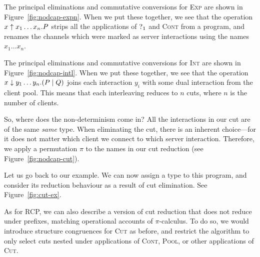 \documentclass[a4paper,UKenglish]{lipics-v2016}
\begin{document}
The principal eliminations and commutative conversions for \textsc{Exp} are
shown in Figure~\ref{fig:nodcap-expn}. When we put these together, we see that
the operation $\expn{x}{x_1 \dots x_n}P$ strips all the applications of
$\give[1]{}$ and \textsc{Cont} from a program, and renames the channels which
were marked as server interactions using the names $x_1 \dots x_n$.
%

%
The principal eliminations and commutative conversions for \textsc{Int} are
shown in Figure~\ref{fig:nodcap-intl}. When we put these together, we see that
the operation $\intl{x}{y_1 \dots y_n}(P \mid Q)$ joins each interaction $y_i$
with some dual interaction from the client pool. This means that each
interleaving reduces to $n$ cuts, where $n$ is the number of clients.
%


So, where does the non-determinism come in? All the interactions in our cut are
of the same \emph{same} type. When eliminating the cut, there is an inherent
choice---for it does not matter which client we connect to which server
interaction. Therefore, we apply a permutation $\pi$ to the names in our cut
reduction (see Figure~\ref{fig:nodcap-cut}).

Let us go back to our example. We can now assign a type to this program, and
consider its reduction behaviour as a result of cut elimination. See
Figure~\ref{fig:cut-ex}.
%


As for RCP, we can also describe a version of cut reduction that does not reduce
under prefixes, matching operational accounts of $\pi$-calculus.  To do so,
we would introduce structure congruences for \textsc{Cut} as before, and
restrict the algorithm to only select cuts nested under applications of
\textsc{Cont}, \textsc{Pool}, or other applications of \textsc{Cut}.
\end{document}
